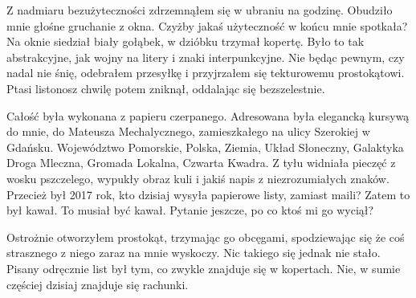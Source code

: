 Z nadmiaru bezużyteczności zdrzemnąłem się w ubraniu na godzinę. Obudziło mnie głośne gruchanie z okna.
Czyżby jakaś użyteczność w końcu mnie spotkała?
Na oknie siedział biały gołąbek, w dzióbku trzymał kopertę. Było to tak abstrakcyjne, jak wojny na litery i znaki interpunkcyjne.
Nie będąc pewnym, czy nadal nie śnię, odebrałem przesyłkę i przyjrzałem się tekturowemu prostokątowi.
Ptasi listonosz chwilę potem zniknął, oddalając się bezszelestnie.

Całość była wykonana z papieru czerpanego.
Adresowana była elegancką kursywą do mnie, do Mateusza Mechalycznego, zamieszkałego na ulicy Szerokiej w Gdańsku.
Województwo Pomorskie, Polska, Ziemia, Układ Słoneczny, Galaktyka Droga Mleczna, Gromada Lokalna, Czwarta Kwadra.
Z tyłu widniała pieczęć z wosku pszczelego, wypukły obraz kuli i jakiś napis z niezrozumiałych znaków.
Przecież był 2017 rok, kto dzisiaj wysyła papierowe listy, zamiast maili?
Zatem to był kawał. To musiał być kawał. Pytanie jeszcze, po co ktoś mi go wyciął?

Ostrożnie otworzyłem prostokąt, trzymając go obcęgami, spodziewając się że coś strasznego z niego zaraz na mnie wyskoczy.
Nic takiego się jednak nie stało.
Pisany odręcznie list był tym, co zwykle znajduje się w kopertach. Nie, w sumie częściej dzisiaj znajduje się rachunki.


